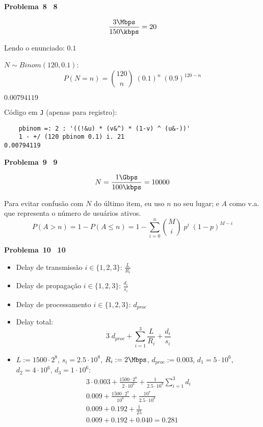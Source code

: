 \documentclass{article}
\newcounter{exe-list}
\newenvironment{exe-list}
    {\begin{list}{\alph{exe-list}.}{\usecounter{exe-list}}}
    {\end{list}}
\newenvironment{exe}[2][]
    {\newcommand{\opt}{(Opcional)}%
    \newcommand{\sketch}[1]{{\bfseries Rascunho:} ##1}%
    \newcommand{\nop}{\hspace{-1ex}}%
    \medskip\par\noindent\ifthenelse{\equal{#1}{}}
        {\textbf{\large Problema~#2}}
        {\textbf{\large #1~#2}}%
    \medskip\par\noindent}
    {\medskip}
\begin{document}
\begin{exe}{8}
    \begin{exe-list}
    \item \[ \frac{3 \Mbps}{150 \kbps} = 20 \]
    \item Lendo o enunciado: \( 0.1 \)
    \item \( N \sim Binom(120, 0.1) \):
        \[ P(N = n) = \binom{120}{n} \; (0.1)^n \; (0.9)^{120-n} \]
    \item \(0.00794119\)
        \par Código em \texttt{J} (apenas para registro):
        \begin{verbatim}
    pbinom =: 2 : '((!&u) * (v&^) * (1-v) ^ (u&-))'
    1 - +/ (120 pbinom 0.1) i. 21
0.00794119
        \end{verbatim}
    \end{exe-list}
\end{exe}

\begin{exe}{9}
    \begin{exe-list}
    \item \[ N = \frac{1 \Gbps}{100 \kbps} = 10000 \]
    \item Para evitar confusão com \(N\) do último item,
        eu uso \(n\) no seu lugar;
        e \(A\) como v.a. que representa
        o número de usuários ativos.
        \[ P(A > n)
            = 1 - P(A \le n)
            = 1 - \sum_{i = 0}^n \binom{M}{i} \; p^i \; (1-p)^{M-i} \]
    \end{exe-list}
\end{exe}

\begin{exe}{10}
    \begin{itemize}
        \item Delay de transmissão \(i \in \{ 1, 2, 3 \}\):
            \( \frac{L}{R_i} \)
        \item Delay de propagação \(i \in \{ 1, 2, 3 \}\):
            \( \frac{d_i}{s_i} \)
        \item Delay de processamento \(i \in \{ 1, 2, 3 \}\):
            \( d_{proc} \)
        \item Delay total:
            \[ 3 \; d_{proc}
                + \sum_{i = 1}^3 \frac{L}{R_i} + \frac{d_i}{s_i}
            \]
        \item \(L := 1500 \cdot 2^8\), \(s_i = 2.5 \cdot 10^8\),
            \(R_i := 2 \Mbps\), \(d_{proc} := 0.003\),
            \(d_1 = 5 \cdot 10^6\), \(d_2 = 4 \cdot 10^6\),
            \(d_3 = 1 \cdot 10^6\):
            \begin{align*}
                3 \cdot 0.003
                    + \frac{1500 \cdot 2^8}{2 \cdot 10^6}
                    + \frac{1}{2.5 \cdot 10^8} \sum_{i = 1}^3 d_i \\
                0.009 + \frac{1500 \cdot 2^7}{10^6}
                    + \frac{10^7}{2.5 \cdot 10^8} \\
                0.009 + 0.192 + \frac{1}{25} \\
                0.009 + 0.192 + 0.040 = 0.281 \\
            \end{align*}
    \end{itemize}
\end{exe}
\end{document}
